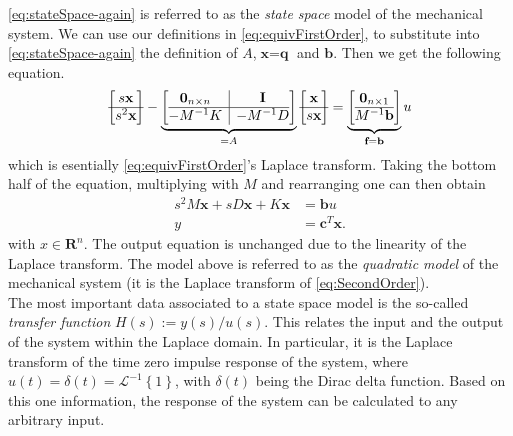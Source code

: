 \documentclass{article}
\begin{document}
	\autoref{eq:stateSpace-again} is referred to as the \emph{state space} model of the mechanical system. %
	We can use our definitions in \autoref{eq:equivFirstOrder}, to substitute into \autoref{eq:stateSpace-again} the definition of $A$,$\textbf{x}=\textbf{q}$ and $\textbf{b}$. Then we get the following equation.
	\begin{equation}
		\begin{bmatrix}
			s\textbf{x} \\\hline s^2 \textbf{x}
		\end{bmatrix} - 
		\underbrace{\left[\begin{array}{@{}c|c@{}}
				\textbf{0}_{n\times n} & \textbf{I} \\\hline -{M}^{-1}K & -{M}^{-1} D
			\end{array}\right]}_{=A} 
		\begin{bmatrix}
			{\textbf{x}} \\\hline s{\textbf{x}}
		\end{bmatrix}
		= \underbrace{\left[\begin{array}{@{}c@{}}
				\textbf{0}_{n\times 1}  \\\hline {M}^{-1} \textbf{b}
			\end{array}\right]}_{\textbf{f}=\textbf{b}} u
	\end{equation}
	which is esentially \autoref{eq:equivFirstOrder}'s Laplace transform. Taking the bottom half of the equation, multiplying with $M$ and rearranging one can then obtain
		\begin{equation}\label{eq:Quadratic}
			\begin{aligned}
				s^2M\mathbf{x}+sD\mathbf{x}+K\mathbf{x}&=\mathbf{b}u\\
				y&=\mathbf{c}^T\mathbf{x}.
			\end{aligned} 
		\end{equation}
		{with $x\in\mathbf{R}^n$.} The output equation is unchanged due to the linearity of the Laplace transform. 
		The model above is referred to as the \emph{quadratic model} of the mechanical system (it is the Laplace transform of \autoref{eq:SecondOrder}).\\
		
	The most important data associated to a state space model is the so-called \emph{transfer function} $H(s):=y(s)/u(s)$.
	This relates the input and the output of the system within the Laplace domain. In particular, it is the Laplace transform of the time zero impulse response of the system, where $u(t) = \delta(t) = \mathcal{L}^{-1}\left\{1\right\}$, with $\delta(t)$ being the Dirac delta function. Based on this one information, the response of the system can be calculated to any arbitrary input.
	
\end{document}
